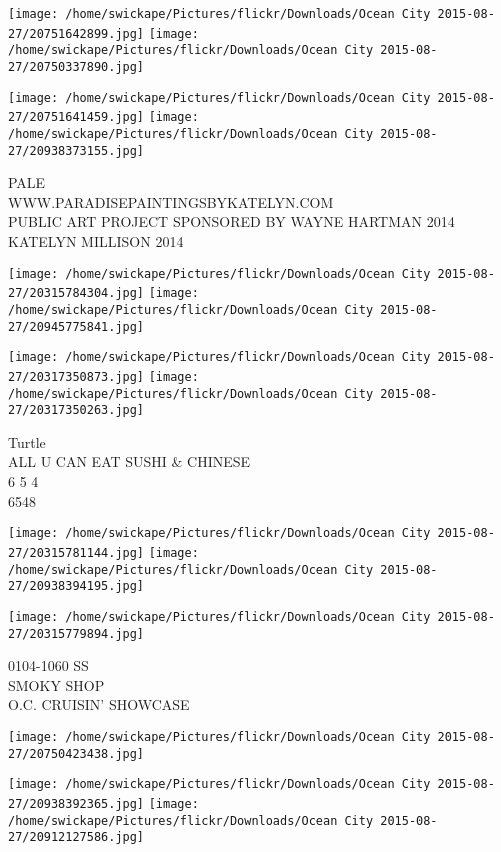 \documentclass[10pt,letterpaper]{article}
\begin{document}
\texttt{[image: /home/swickape/Pictures/flickr/Downloads/Ocean City 2015-08-27/20751642899.jpg]}
\texttt{[image: /home/swickape/Pictures/flickr/Downloads/Ocean City 2015-08-27/20750337890.jpg]}

\texttt{[image: /home/swickape/Pictures/flickr/Downloads/Ocean City 2015-08-27/20751641459.jpg]}
\texttt{[image: /home/swickape/Pictures/flickr/Downloads/Ocean City 2015-08-27/20938373155.jpg]}

PALE\\
WWW.PARADISEPAINTINGSBYKATELYN.COM\\
PUBLIC ART PROJECT SPONSORED BY WAYNE HARTMAN 2014\\
KATELYN MILLISON 2014\\
\pagebreak

\texttt{[image: /home/swickape/Pictures/flickr/Downloads/Ocean City 2015-08-27/20315784304.jpg]}
\texttt{[image: /home/swickape/Pictures/flickr/Downloads/Ocean City 2015-08-27/20945775841.jpg]}

\texttt{[image: /home/swickape/Pictures/flickr/Downloads/Ocean City 2015-08-27/20317350873.jpg]}
\texttt{[image: /home/swickape/Pictures/flickr/Downloads/Ocean City 2015-08-27/20317350263.jpg]}

Turtle\\
ALL U CAN EAT SUSHI \& CHINESE\\
6 5 4\\
6548\\
\pagebreak

\texttt{[image: /home/swickape/Pictures/flickr/Downloads/Ocean City 2015-08-27/20315781144.jpg]}
\texttt{[image: /home/swickape/Pictures/flickr/Downloads/Ocean City 2015-08-27/20938394195.jpg]}

\vspace{0.25in}
\texttt{[image: /home/swickape/Pictures/flickr/Downloads/Ocean City 2015-08-27/20315779894.jpg]}

0104{-}1060 SS\\
SMOKY SHOP\\
O.C. CRUISIN' SHOWCASE\\
\pagebreak

\texttt{[image: /home/swickape/Pictures/flickr/Downloads/Ocean City 2015-08-27/20750423438.jpg]}

\vspace{0.25in}
\texttt{[image: /home/swickape/Pictures/flickr/Downloads/Ocean City 2015-08-27/20938392365.jpg]}
\texttt{[image: /home/swickape/Pictures/flickr/Downloads/Ocean City 2015-08-27/20912127586.jpg]}
\end{document}
